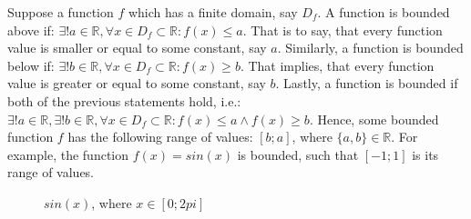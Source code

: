 \documentclass[10pt,a4paper]{article}
\begin{document}
Suppose a function $f$ which has a finite domain, say $D_f$. A function is bounded above if: 
$\exists! a \in \mathbb{R}, \forall x \in D_f \subset \mathbb{R}: f(x) \leq a$. That is to say,
that every function value is smaller or equal to some constant, say $a$. Similarly, a function
is bounded below if: $\exists! b \in \mathbb{R}, \forall x \in D_f \subset \mathbb{R}: f(x) 
\geq b$. That implies, that every function value is greater or equal to some constant, say $b$.
Lastly, a function is bounded if both of the previous statements hold, i.e.:
$\exists! a \in \mathbb{R}, \exists! b \in \mathbb{R}, \forall x \in D_f \subset \mathbb{R}:
f(x) \leq a \land f(x) \geq b$. Hence, some bounded function $f$ has the following range of 
values: $[b;a]$, where $\{a,b\} \in \mathbb{R}$. For example, the function $f(x) = sin(x)$ 
is bounded, such that $[-1;1]$ is its range of values. \\

\begin{figure}[htp]
    \begin{center}  %
    \end{center}

    \caption{$sin(x)$, where $x \in [0;2 pi]$}
\end{figure}

\end{document}
